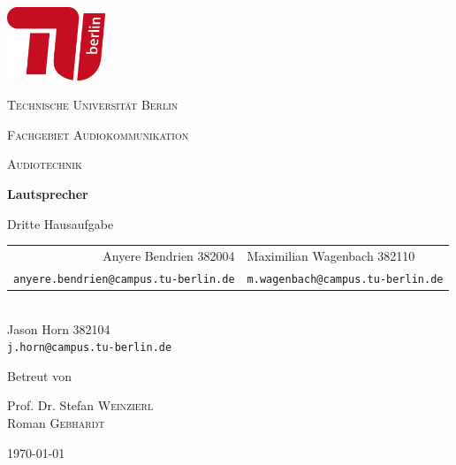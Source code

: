 \begin{titlepage}
    \centering
    \includegraphics[height=62pt]{tu_red.png}\par
    {\scshape\huge Technische Universität Berlin \par}
    {\scshape\Large Fachgebiet Audiokommunikation\par}
    \vspace{1.5cm}
    {\scshape\LARGE Audiotechnik\par}
    \vspace{1.5cm}

    {\Huge\bfseries {Lautsprecher}\par}
    \vspace{0.1cm}
    {\large Dritte Hausaufgabe\par}
    \vspace{1cm}

    {\itshape
        \begin{tabular}{rl}
          Anyere Bendrien 382004 &
          Maximilian Wagenbach 382110 \\
          \vspace{0.2cm}
          \small \texttt{anyere.bendrien@campus.tu-berlin.de} &
          \small \texttt{m.wagenbach@campus.tu-berlin.de}
        \end{tabular}\\
        Jason Horn 382104 \\
        \small \texttt{j.horn@campus.tu-berlin.de} 
    }
    \vfill
    
    Betreut von\par
    Prof. Dr. Stefan \textsc{Weinzierl} \\
    Roman \textsc{Gebhardt}
    \vspace{1cm}
    
    {\large \today\par}
\end{titlepage}